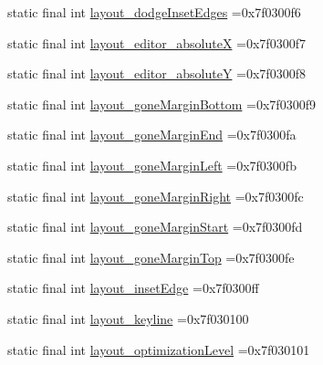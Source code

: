 \begin{DoxyCompactItemize}
\item 
static final int \mbox{\hyperlink{classcom_1_1example_1_1trainawearapplication_1_1_r_1_1attr_a8962615fce01a8841ab265216464ccc5}{layout\+\_\+dodge\+Inset\+Edges}} =0x7f0300f6
\item 
static final int \mbox{\hyperlink{classcom_1_1example_1_1trainawearapplication_1_1_r_1_1attr_ad35a5ce68e8bbb2c72dc9ebd44be7125}{layout\+\_\+editor\+\_\+absoluteX}} =0x7f0300f7
\item 
static final int \mbox{\hyperlink{classcom_1_1example_1_1trainawearapplication_1_1_r_1_1attr_ac6edf8148c894452ea2cf51a7470da4f}{layout\+\_\+editor\+\_\+absoluteY}} =0x7f0300f8
\item 
static final int \mbox{\hyperlink{classcom_1_1example_1_1trainawearapplication_1_1_r_1_1attr_af7ede1e194a5d45714927c5b07c3c7b1}{layout\+\_\+gone\+Margin\+Bottom}} =0x7f0300f9
\item 
static final int \mbox{\hyperlink{classcom_1_1example_1_1trainawearapplication_1_1_r_1_1attr_a74071c7b63cbbee66d73c874ad80cfe9}{layout\+\_\+gone\+Margin\+End}} =0x7f0300fa
\item 
static final int \mbox{\hyperlink{classcom_1_1example_1_1trainawearapplication_1_1_r_1_1attr_a1e84d4025e84fa8f1fa9982bceea7a3e}{layout\+\_\+gone\+Margin\+Left}} =0x7f0300fb
\item 
static final int \mbox{\hyperlink{classcom_1_1example_1_1trainawearapplication_1_1_r_1_1attr_a55cb89b09c81ad684916c8cbb29fa7a7}{layout\+\_\+gone\+Margin\+Right}} =0x7f0300fc
\item 
static final int \mbox{\hyperlink{classcom_1_1example_1_1trainawearapplication_1_1_r_1_1attr_ae038797bb9a948a8fcf94912949742d5}{layout\+\_\+gone\+Margin\+Start}} =0x7f0300fd
\item 
static final int \mbox{\hyperlink{classcom_1_1example_1_1trainawearapplication_1_1_r_1_1attr_a5dda0b6666992179df463c28f5c4e3f2}{layout\+\_\+gone\+Margin\+Top}} =0x7f0300fe
\item 
static final int \mbox{\hyperlink{classcom_1_1example_1_1trainawearapplication_1_1_r_1_1attr_abcd6d7e80e8f9c8a04df76b311da8601}{layout\+\_\+inset\+Edge}} =0x7f0300ff
\item 
static final int \mbox{\hyperlink{classcom_1_1example_1_1trainawearapplication_1_1_r_1_1attr_a961ed2aee052a08b6271969347daa703}{layout\+\_\+keyline}} =0x7f030100
\item 
static final int \mbox{\hyperlink{classcom_1_1example_1_1trainawearapplication_1_1_r_1_1attr_a846b800d2524edf4d9d3f2201fff7247}{layout\+\_\+optimization\+Level}} =0x7f030101

\end{DoxyCompactItemize}
